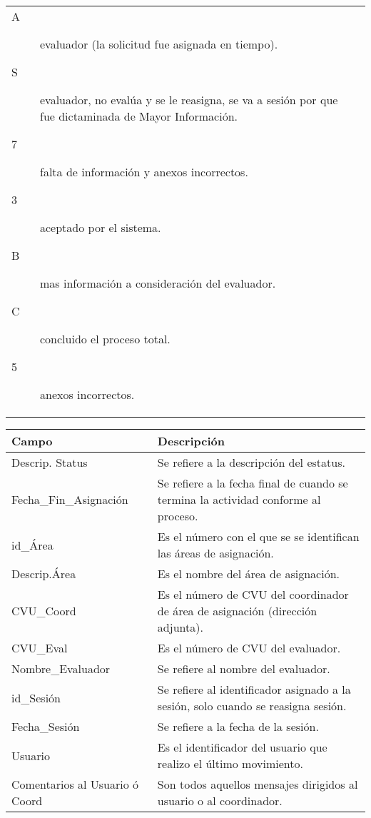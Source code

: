 \begin{tabular}{ m{} m{}  }
\begin{description}
                    \item[A] evaluador (la solicitud fue asignada en tiempo).
                    \item[S] evaluador, no evalúa y se le reasigna, se va a sesión por que fue dictaminada de Mayor Información.
                    \item[7] falta de información y anexos incorrectos.
                    \item[3] aceptado por el sistema.
                    \item[B] mas información a consideración del evaluador.
                    \item[C] concluido el proceso total.
                    \item[5] anexos incorrectos.
               \end{description}\\
\end{tabular}

\begin{tabular}{ m{} m{}  }%
	\rowcolor{gray1} {\bf Campo} &  {\bf Descripción} \\ \hline \hline

	\rowcolor{gray1}Descrip. Status & Se refiere a la descripción del estatus.\\
	Fecha\_Fin\_Asignación & Se refiere a la fecha final de cuando se termina la actividad conforme al proceso.\\
	\rowcolor{gray1}id\_Área & Es el número con el que se se identifican las áreas de asignación.\\
	Descrip.Área & Es el nombre del área de asignación.\\
	\rowcolor{gray1}CVU\_Coord & Es el número de CVU del coordinador de área de asignación (dirección adjunta).\\
	CVU\_Eval & Es el número de CVU del evaluador.\\
	\rowcolor{gray1}Nombre\_Evaluador & Se refiere al nombre del evaluador.\\
	id\_Sesión & Se refiere al identificador asignado a la sesión, solo cuando se reasigna sesión.\\
	\rowcolor{gray1}Fecha\_Sesión & Se refiere a la fecha de la sesión.\\
	Usuario & Es el identificador del usuario que realizo el último movimiento.\\
	\rowcolor{gray1}Comentarios al Usuario ó Coord & Son todos aquellos mensajes dirigidos al usuario o al coordinador.\\
\end{tabular}

